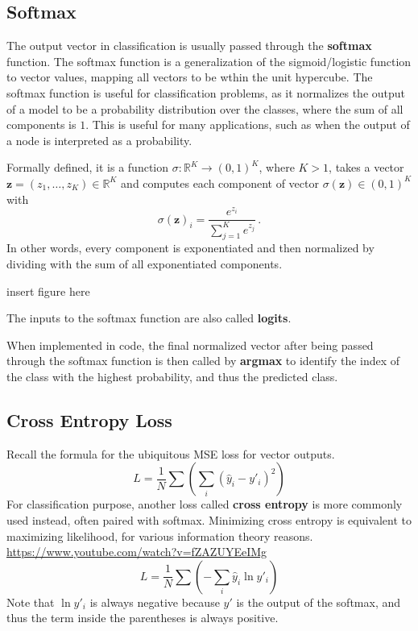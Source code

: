 \documentclass[12pt]{report}
\theoremstyle{definition}
\theoremstyle{remark}
\begin{document}
\subsection{Softmax}
The output vector in classification is usually passed through the \textbf{softmax} function. The softmax function is a generalization of the sigmoid/logistic function to vector values, mapping all vectors to be wthin the unit hypercube. The softmax function is useful for classification problems, as it normalizes the output of a model to be a probability distribution over the classes, where the sum of all components is $1$. This is useful for many applications, such as when the output of a node is interpreted as a probability.

Formally defined, it is a function $\sigma\colon \mathbb{R}^K \to (0, 1)^K$, where $K > 1$, takes a vector $\mathbf{z} = (z_1, \dotsc, z_K) \in \mathbb{R}^K$ and computes each component of vector $\sigma(\mathbf{z}) \in (0, 1)^K$ with
\begin{equation}
\sigma(\mathbf{z})_i = \frac{e^{z_i}}{\sum_{j=1}^K e^{z_j}}\,.
\end{equation}
In other words, every component is exponentiated and then normalized by dividing with the sum of all exponentiated components.

insert figure here

The inputs to the softmax function are also called \textbf{logits}.

When implemented in code, the final normalized vector after being passed through the softmax function is then called by \textbf{argmax} to identify the index of the class with the highest probability, and thus the predicted class.

\subsection{Cross Entropy Loss}

Recall the formula for the ubiquitous MSE loss for vector outputs.
\begin{equation}
L = \frac{1}{N}\sum \left(\sum_i (\hat{y}_i-y'_i)^2\right)
\end{equation}
For classification purpose, another loss called \textbf{cross entropy} is more commonly used instead, often paired with softmax. Minimizing cross entropy is equivalent to maximizing likelihood, for various information theory reasons. \url{https://www.youtube.com/watch?v=fZAZUYEeIMg}
\begin{equation}
L = \frac{1}{N}\sum \left(-\sum_i \hat{y}_i \ln y'_i\right)
\end{equation}
Note that $\ln y'_i$ is always negative because $y'$ is the output of the softmax, and thus the term inside the parentheses is always positive.
\end{document}
